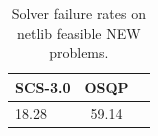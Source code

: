 \begin{table}
\centering
\caption{Solver failure rates on netlib feasible NEW problems.}
\label{t-netlib feasible NEW-failure}
\begin{tabular}{lcc}
\toprule
 SCS-3.0 &  OSQP \\
\midrule
   18.28 & 59.14 \\
\bottomrule
\end{tabular}
\end{table}
